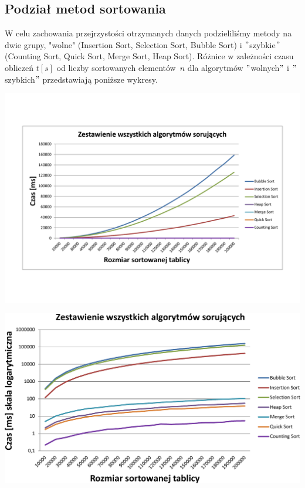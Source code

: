 \documentclass[polish,polish,a4paper]{article}
\begin{document}
\begin{spacing}{1.5}
	\subsection{Podział metod sortowania}
	W celu zachowania przejrzystości  otrzymanych danych podzieliliśmy metody na dwie grupy, "wolne" (Insertion Sort, Selection Sort, Bubble Sort) i $ " $szybkie$ " $ (Counting Sort, Quick Sort, Merge Sort, Heap Sort). Różnice w zależności czasu obliczeń $ t[s]$ od liczby sortowanych elementów~$ n $ dla algorytmów $ " $wolnych$ " $ i $ " $szybkich$ " $ przedstawiają poniższe wykresy.\\
	
	
\begin{minipage}[H]{\textwidth}
	\centering
	\includegraphics[scale=0.6]{zad2wsznor.pdf}
	\label{fig:2wszn}
\end{minipage}

\begin{minipage}[H]{\textwidth}
	\centering
	\includegraphics[scale=0.6]{zad2wszlog.pdf}
	\label{fig:2wszl}
\end{minipage}
	

\end{spacing}
\end{document}

